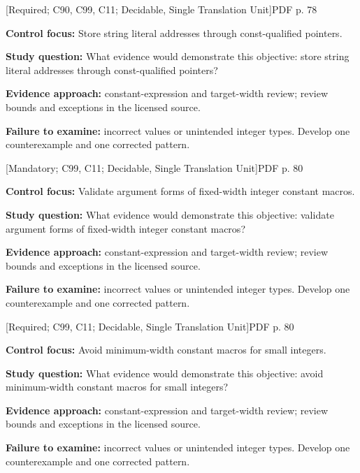 \documentclass[10pt,letterpaper]{article}
\begin{document}
\smallskip
{}
 \textsf{\footnotesize [Required; C90, C99, C11; Decidable, Single Translation Unit]}\hfill{\footnotesize PDF p. 78}\par
\textbf{Control focus:} Store string literal addresses through const-qualified pointers.\par
\textbf{Study question:} What evidence would demonstrate this objective: store string literal addresses through const-qualified pointers?\par
\textbf{Evidence approach:} constant-expression and target-width review; review bounds and exceptions in the licensed source.\par
\textbf{Failure to examine:} incorrect values or unintended integer types. Develop one counterexample and one corrected pattern.\par
\smallskip
{}
 \textsf{\footnotesize [Mandatory; C99, C11; Decidable, Single Translation Unit]}\hfill{\footnotesize PDF p. 80}\par
\textbf{Control focus:} Validate argument forms of fixed-width integer constant macros.\par
\textbf{Study question:} What evidence would demonstrate this objective: validate argument forms of fixed-width integer constant macros?\par
\textbf{Evidence approach:} constant-expression and target-width review; review bounds and exceptions in the licensed source.\par
\textbf{Failure to examine:} incorrect values or unintended integer types. Develop one counterexample and one corrected pattern.\par
\smallskip
{}
 \textsf{\footnotesize [Required; C99, C11; Decidable, Single Translation Unit]}\hfill{\footnotesize PDF p. 80}\par
\textbf{Control focus:} Avoid minimum-width constant macros for small integers.\par
\textbf{Study question:} What evidence would demonstrate this objective: avoid minimum-width constant macros for small integers?\par
\textbf{Evidence approach:} constant-expression and target-width review; review bounds and exceptions in the licensed source.\par
\textbf{Failure to examine:} incorrect values or unintended integer types. Develop one counterexample and one corrected pattern.\par
\smallskip
\end{document}
